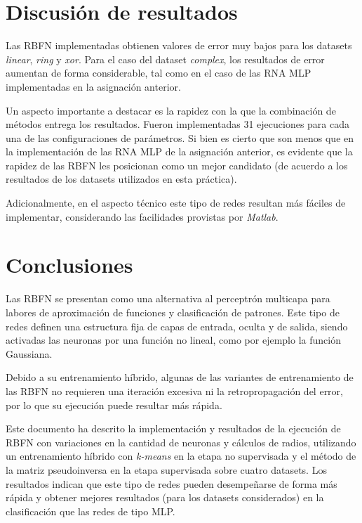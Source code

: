 \documentclass[journal]{IEEEtran}
\begin{document}


\section{Discusión de resultados}
\label{sec:discusion}
Las RBFN implementadas obtienen valores de error muy bajos para los datasets \emph{linear}, \emph{ring} y \emph{xor}.
Para el caso del dataset \emph{complex}, los resultados de error aumentan de forma considerable, tal como en el caso de las RNA MLP implementadas en la asignación anterior.

Un aspecto importante a destacar es la rapidez con la que la combinación de métodos entrega los resultados.
Fueron implementadas 31 ejecuciones para cada una de las configuraciones de parámetros.
Si bien es cierto que son menos que en la implementación de las RNA MLP de la asignación anterior, es evidente que la rapidez de las RBFN les posicionan como un mejor candidato (de acuerdo a los resultados de los datasets utilizados en esta práctica).

Adicionalmente, en el aspecto técnico este tipo de redes resultan más fáciles de implementar, considerando las facilidades provistas por \emph{Matlab}.



\section{Conclusiones}
\label{sec:conclusiones}
Las RBFN se presentan como una alternativa al perceptrón multicapa para labores de aproximación de funciones y clasificación de patrones.
Este tipo de redes definen una estructura fija de capas de entrada, oculta y de salida, siendo activadas las neuronas por una función no lineal, como por ejemplo la función Gaussiana.

Debido a su entrenamiento híbrido, algunas de las variantes de entrenamiento de las RBFN no requieren una iteración excesiva ni la retropropagación del error, por lo que su ejecución puede resultar más rápida.

Este documento ha descrito la implementación y resultados de la ejecución de RBFN con variaciones en la cantidad de neuronas y cálculos de radios, utilizando un entrenamiento híbrido con \emph{k-means} en la etapa no supervisada y el método de la matriz pseudoinversa en la etapa supervisada sobre cuatro datasets.
Los resultados indican que este tipo de redes pueden desempeñarse de forma más rápida y obtener mejores resultados (para los datasets considerados) en la clasificación que las redes de tipo MLP.

\nocite{*}


\end{document}
